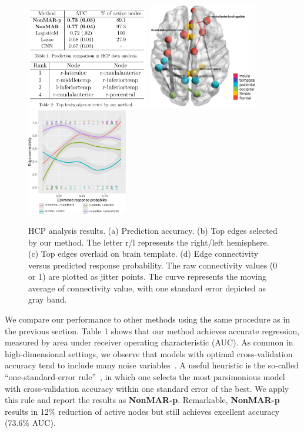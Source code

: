 \documentclass[11pt]{article}
\theoremstyle{definition}
\begin{document}
\begin{figure}[ht]
    \centering
       \includegraphics[width=5.3cm]{compare}\hspace{.8cm}
   \includegraphics[width=4.8cm]{brain.pdf}\hspace{.8cm}
          \includegraphics[width=4.4cm]{traj2.pdf}
 \caption{HCP analysis results. (a) Prediction accuracy. (b) Top edges selected by our method. The letter r/l represents the right/left hemisphere. (c) Top edges overlaid on brain template. (d) Edge connectivity versus predicted response probability. The raw connectivity values (0 or 1) are plotted as jitter points. The curve represents the moving average of connectivity value, with one standard error depicted as gray band. }\label{fig:real}
\end{figure}

We compare our performance to other methods using the same procedure as in the previous section. Table 1 shows that our method achieves accurate regression, measured by area under receiver operating characteristic (AUC). As common in high-dimensional settings, we observe that models with optimal cross-validation accuracy tend to include many noise variables~\citep{hastie2015statistical}. A useful heuristic is the so-called ``one-standard-error rule''~\citep{hastie2015statistical}, in which one selects the most parsimonious model with cross-validation accuracy within one standard error of the best. We apply this rule and report the results as {\bf \small NonMAR-p}. Remarkable, {\bf \small NonMAR-p} results in 12\% reduction of active nodes but still achieves excellent accuracy (73.6\% AUC). 
\end{document}

